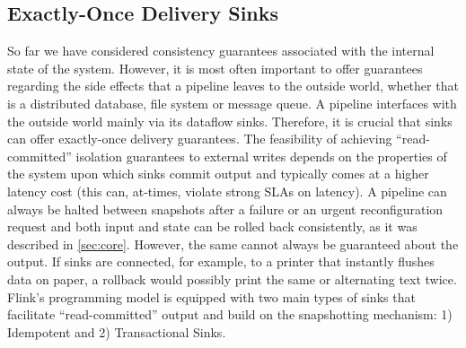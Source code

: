 \subsection{Exactly-Once Delivery Sinks}
\label{sec:outputcommit}



So far we have considered consistency guarantees associated with the internal state of the system. However, it is most often important to offer guarantees regarding the side effects that a pipeline leaves to the outside world, whether that is a distributed database, file system or message queue. A pipeline interfaces with the outside world mainly via its dataflow sinks. Therefore, it is crucial that sinks can offer exactly-once delivery guarantees. The feasibility of achieving ``read-committed'' isolation guarantees to external writes depends on the properties of the system upon which sinks commit output and typically comes at a higher latency cost (this can, at-times, violate strong SLAs on latency). A pipeline can always be halted between snapshots after a failure or an urgent reconfiguration request and both input and state can be rolled back consistently, as it was described in \autoref{sec:core}. However, the same cannot always be guaranteed about the output. If sinks are connected, for example, to a printer that instantly flushes data on paper, a rollback would possibly print the same or alternating text twice. Flink's programming model is equipped with two main types of sinks that facilitate ``read-committed'' output and build on the snapshotting mechanism: 1) Idempotent and 2) Transactional Sinks.



